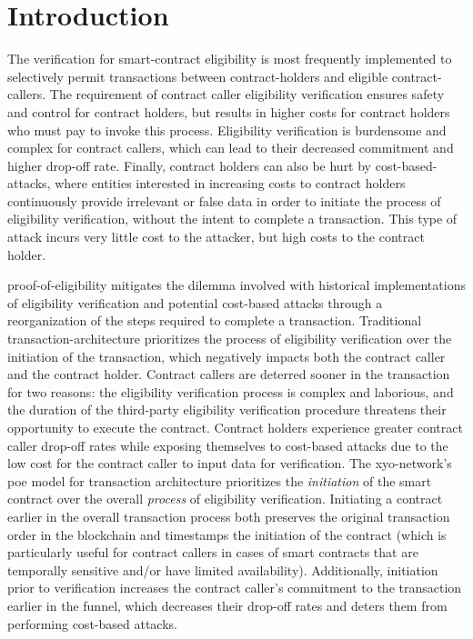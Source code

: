 \documentclass{article}
\begin{document}
\section{Introduction}
The verification for \Gls{smart-contract} eligibility is most frequently implemented to selectively permit transactions between \glspl{contract-holder} and eligible \glspl{contract-caller}. The requirement of contract caller eligibility verification ensures safety and control for contract holders, but results in higher costs for contract holders who must pay to invoke this process. Eligibility verification is burdensome and complex for contract callers, which can lead to their decreased commitment and higher drop-off rate. Finally, contract holders can also be hurt by \glspl{cost-based-attack}, where entities interested in increasing costs to contract holders continuously provide irrelevant or false data in order to initiate the process of eligibility verification, without the intent to complete a transaction. This type of attack incurs very little cost to the attacker, but high costs to the contract holder.

\Gls{proof-of-eligibility} mitigates the dilemma involved with historical implementations of eligibility verification and potential cost-based attacks through a reorganization of the steps required to complete a transaction. Traditional \gls{transaction-architecture} prioritizes the process of eligibility verification over the initiation of the transaction, which negatively impacts both the contract caller and the contract holder. Contract callers are deterred sooner in the transaction for two reasons: the eligibility verification process is complex and laborious, and the duration of the third-party eligibility verification procedure threatens their opportunity to execute the contract. Contract holders experience greater contract caller drop-off rates while exposing themselves to cost-based attacks due to the low cost for the contract caller to input data for verification. The \Gls{xyo-network}'s \acrshort{poe} model for transaction architecture prioritizes the \textit{initiation} of the smart contract over the overall \textit{process} of eligibility verification. Initiating a contract earlier in the overall transaction process both preserves the original transaction order in the blockchain and timestamps the initiation of the contract (which is particularly useful for contract callers in cases of smart contracts that are temporally sensitive and/or have limited availability). Additionally, initiation prior to verification increases the contract caller's commitment to the transaction earlier in the funnel, which decreases their drop-off rates and deters them from performing cost-based attacks.
\end{document}
